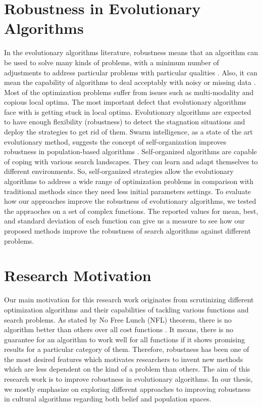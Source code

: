 \section{Robustness in Evolutionary Algorithms}
In the evolutionary algorithms literature, robustness means that an algorithm can be used to solve many kinds of problems, with a minimum number of adjustments to address particular problems with particular qualities \cite{che2010robust}. Also, it can mean the capability of algorithms to deal acceptably with noisy or missing data \cite{kennedy2001swarm}. Most of the optimization problems suffer from issues such as multi-modality and copious local optima. The most important defect that evolutionary algorithms face with is getting stuck in local optima. Evolutionary algorithms are expected to have enough flexibility (robustness) to detect the stagnation situations and deploy the strategies to get rid of them.\newline
Swarm intelligence, as a state of the art evolutionary method, suggests the concept of self-organization improves robustness in population-based algorithms \cite{blum2015swarm}. Self-organized algorithms are capable of coping with various search landscapes. They can learn and adapt themselves to different environments. So, self-organized strategies allow the evolutionary algorithms to address a wide range of optimization problems in comparison with traditional methods since they need less initial parameters settings. \newline
To evaluate how our approaches improve the robustness of evolutionary algorithms, we tested the appraoches on a set of complex functions. The reported values for mean, best, and standard deviation of each function can give us a measure to see how our proposed methods improve the robustness of search algorithms against different problems.
\section{Research Motivation}
Our main motivation for this research work originates from scrutinizing different optimization algorithms and their capabilities of tackling various functions and search problems. As stated by No Free Lunch (NFL) theorem, there is no algorithm better than others over all cost functions \cite{wolpert1997no}. It means, there is no guarantee for an algorithm to work well for all functions if it shows promising results for a particular category of them. Therefore, robustness has been one of the most desired features which motivates researchers to invent new methods which are less dependent on the kind of a problem than others. The aim of this research work is to improve robustness in evolutionary algorithms. In our thesis, we mostly emphasize on exploring different approaches to improving robustness in cultural algorithms regarding both belief and population spaces.\newline
